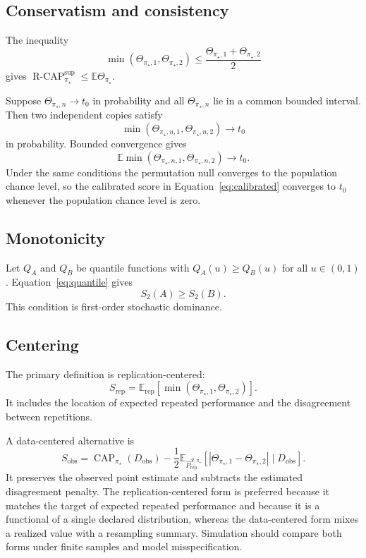 \documentclass[11pt]{article}
\newcommand{\CAP}{\operatorname{CAP}}
\newcommand{\Regime}{\mathcal{R}}
\newcommand{\Tpi}{\CAP_{\pi_\star}}
\newcommand{\E}{\mathbb{E}}
\newcommand{\RCAP}{\operatorname{R\text{-}CAP}^{\mathrm{sup}}_{\pi_\star}}
\newcommand{\PRepHat}{\widehat{P}_{\mathrm{rep}}^{\Regime,\pi_\star}}
\theoremstyle{remark}
\begin{document}
\subsection{Conservatism and consistency}

The inequality
\[
\min(\Theta_{\pi_\star,1},\Theta_{\pi_\star,2})
\leq
\frac{\Theta_{\pi_\star,1}+\Theta_{\pi_\star,2}}{2}
\]
gives $\RCAP\leq\E\Theta_{\pi_\star}$.

Suppose $\Theta_{\pi_\star,n}\to t_0$ in probability and all $\Theta_{\pi_\star,n}$ lie in a common bounded interval. Then two independent copies satisfy
\[
\min(\Theta_{\pi_\star,n,1},\Theta_{\pi_\star,n,2})\to t_0
\]
in probability. Bounded convergence gives
\[
\E\min(\Theta_{\pi_\star,n,1},\Theta_{\pi_\star,n,2})\to t_0.
\]
Under the same conditions the permutation null converges to the population chance level, so the calibrated score in Equation~\eqref{eq:calibrated} converges to $t_0$ whenever the population chance level is zero.

\subsection{Monotonicity}

Let $Q_A$ and $Q_B$ be quantile functions with $Q_A(u)\geq Q_B(u)$ for all $u\in(0,1)$. Equation~\eqref{eq:quantile} gives
\[
S_2(A)\geq S_2(B).
\]
This condition is first-order stochastic dominance.

\subsection{Centering}
\label{app:centering}

The primary definition is replication-centered:
\[
S_{\mathrm{rep}}
=
\E_{\mathrm{rep}}
\left[
\min(\Theta_{\pi_\star,1},\Theta_{\pi_\star,2})
\right].
\]
It includes the location of expected repeated performance and the disagreement between repetitions.

A data-centered alternative is
\[
S_{\mathrm{obs}}
=
\Tpi(D_{\mathrm{obs}})
-
\frac12
\E_{\PRepHat}
\left[
|\Theta_{\pi_\star,1}-\Theta_{\pi_\star,2}|
\mid D_{\mathrm{obs}}
\right].
\]
It preserves the observed point estimate and subtracts the estimated disagreement penalty. The replication-centered form is preferred because it matches the target of expected repeated performance and because it is a functional of a single declared distribution, whereas the data-centered form mixes a realized value with a resampling summary. Simulation should compare both forms under finite samples and model misspecification.
\end{document}
